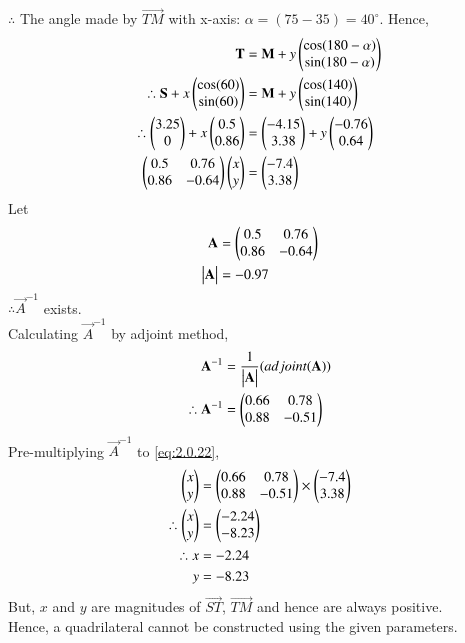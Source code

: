 \documentclass[journal,12pt,twocolumn]{IEEEtran}
\begin{document}
$\therefore$ The angle made by $\vec{TM}$ with x-axis: $ \alpha = (75-35) = 40^{\circ}$.
Hence,
\begin{align}
\mathbf{T} &= \mathbf{M} + y\begin{pmatrix}\cos(180 - \alpha)\\ \sin(180 - \alpha)\end{pmatrix}\\
\therefore \mathbf{S} + x\begin{pmatrix}\cos(60)\\\sin(60)\end{pmatrix} &= \mathbf{M} + y\begin{pmatrix}\cos(140)\\\sin(140)\end{pmatrix}\\
\therefore \begin{pmatrix}3.25\\0\end{pmatrix} + x\begin{pmatrix}0.5\\0.86\end{pmatrix} &= \begin{pmatrix}-4.15 \\ 3.38\end{pmatrix} + y\begin{pmatrix}-0.76\\0.64\end{pmatrix}\\
\begin{pmatrix}0.5 & 0.76\\ 0.86 & -0.64\end{pmatrix}\begin{pmatrix}x\\y\end{pmatrix} &= \begin{pmatrix}-7.4\\3.38\end{pmatrix} \label{eq:2.0.22}
\end{align}
Let
\begin{align}
    \mathbf{A} &= \begin{pmatrix}0.5 & 0.76\\ 0.86 & -0.64\end{pmatrix}\\
    \begin{vmatrix}\mathbf{A}\end{vmatrix} &= -0.97
\end{align}
$\therefore \vec{A}^{-1}$ exists. 
\\Calculating $\vec{A}^{-1}$ by adjoint method,
\begin{align}
    \mathbf{A}^{-1} &= \dfrac{1}{\begin{vmatrix}\mathbf{A}\end{vmatrix}}(adjoint(\mathbf{A}))\\
    \therefore \mathbf{A}^{-1} &= \begin{pmatrix}0.66 & 0.78\\ 0.88 & -0.51\end{pmatrix}
\end{align}
Pre-multiplying $\vec{A}^{-1}$ to \eqref{eq:2.0.22},
\begin{align}
    \begin{pmatrix}x\\y\end{pmatrix} &= \begin{pmatrix}0.66 & 0.78\\ 0.88 & -0.51\end{pmatrix}\times \begin{pmatrix}-7.4\\3.38\end{pmatrix}\\
    \therefore \begin{pmatrix}x \\ y\end{pmatrix} &= \begin{pmatrix}-2.24\\-8.23\end{pmatrix}\\
    \therefore x &= -2.24\\
    y &= -8.23
\end{align}
But, $x$ and $y$ are magnitudes of $\vec{ST}$, $\vec{TM}$ and hence are always positive.\\
Hence, a quadrilateral cannot be constructed using the given parameters.
\end{document}
